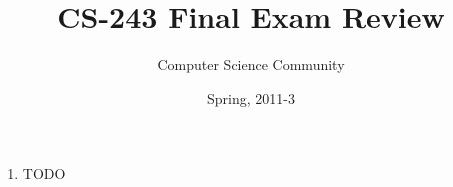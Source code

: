 \documentclass[11pt]{article}
\author{Computer Science Community}
\title{CS-243 Final Exam Review}
\date{Spring, 2011-3}
\makeatletter
\let\thetitle\@title
\let\thedate\@date
\makeatother
\begin{document}
\noindent{\Large \thetitle \hfill \thedate}

\begin{enumerate}

\item TODO

\end{enumerate}
\end{document}
